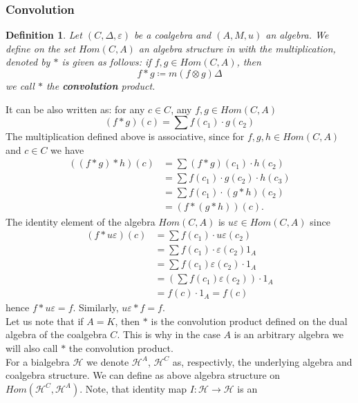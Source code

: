 \documentclass[a4paper, 12pt]{report}
\newtheorem{definition}{Definition}
\begin{document}
\subsubsection{Convolution}
\begin{definition}
Let $(C, \Delta, \varepsilon)$ be a coalgebra and $(A, M, u)$ an algebra. We define on the set $Hom(C, A)$
an algebra structure in with the multiplication, denoted by $*$ is given as follows: if
$f, g \in Hom(C, A)$, then
\begin{equation*}
f*g \coloneqq m(f \otimes g)\Delta
\end{equation*}
we call $*$ the \textbf{convolution} product.
\end{definition}
It can be also written as: for any $c \in C$, any $f, g \in Hom(C, A)$
\begin{equation*}
(f*g)(c) = \sum f(c_1) \cdot g(c_2)
\end{equation*}
The multiplication defined above is associative, since for $f, g, h \in Hom(C, A)$ and
$c \in C$ we have
\begin{align*}
((f*g)*h)(c) &= \sum(f*g)(c_1)\cdot h(c_2) \\
&= \sum f(c_1) \cdot g(c_2) \cdot h(c_3) \\
&= \sum f(c_1) \cdot (g*h)(c_2) \\
&= (f*(g*h))(c).
\end{align*}
The identity element of the algebra $Hom(C, A)$ is $u\varepsilon \in Hom(C, A)$ since
\begin{align*}
(f * u\varepsilon)(c) &= \sum f(c_1) \cdot u\varepsilon(c_2) \\
&= \sum f(c_1) \cdot \varepsilon(c_2)1_A \\
&= \sum f(c_1)\varepsilon(c_2) \cdot 1_A \\
&= \left(\sum f(c_1)\varepsilon(c_2)\right)\cdot 1_A \\
&= f(c) \cdot 1_A = f(c)
\end{align*}
hence $f * u\varepsilon = f$. Similarly, $u\varepsilon * f = f$. \\
Let us note that if $A = K$, then $*$ is the convolution product defined on the dual algebra of the 
coalgebra $C$. This is why in the case $A$ is an arbitrary algebra we will also call $*$ the convolution 
product. \\[8pt]
\indent For a bialgebra $\mathcal{H}$ we denote $\mathcal{H}^A$, $\mathcal{H}^C$ as, respectivly,
the underlying algebra and coalgebra structure. We can define as above algebra structure on
$Hom(\mathcal{H}^C, \mathcal{H}^A)$. Note, that identity map $I : \mathcal{H} \to \mathcal{H}$ is an
\end{document}
